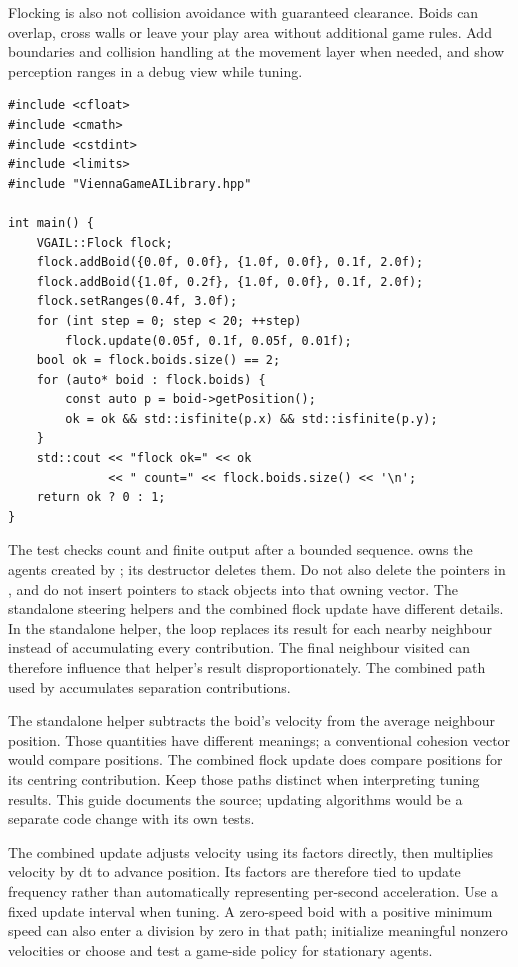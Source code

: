 \documentclass[11pt,a4paper]{article}
\begin{document}
Flocking is also not collision avoidance with guaranteed clearance. Boids can overlap, cross walls or leave your play area without additional game rules. Add boundaries and collision handling at the movement layer when needed, and show perception ranges in a debug view while tuning.
\begin{lstlisting}
#include <cfloat>
#include <cmath>
#include <cstdint>
#include <limits>
#include "ViennaGameAILibrary.hpp"

int main() {
    VGAIL::Flock flock;
    flock.addBoid({0.0f, 0.0f}, {1.0f, 0.0f}, 0.1f, 2.0f);
    flock.addBoid({1.0f, 0.2f}, {1.0f, 0.0f}, 0.1f, 2.0f);
    flock.setRanges(0.4f, 3.0f);
    for (int step = 0; step < 20; ++step)
        flock.update(0.05f, 0.1f, 0.05f, 0.01f);
    bool ok = flock.boids.size() == 2;
    for (auto* boid : flock.boids) {
        const auto p = boid->getPosition();
        ok = ok && std::isfinite(p.x) && std::isfinite(p.y);
    }
    std::cout << "flock ok=" << ok
              << " count=" << flock.boids.size() << '\n';
    return ok ? 0 : 1;
}
\end{lstlisting}
The test checks count and finite output after a bounded sequence.  owns the agents created by ; its destructor deletes them. Do not also delete the pointers in , and do not insert pointers to stack objects into that owning vector.
The standalone steering helpers and the combined flock update have different details. In the standalone  helper, the loop replaces its result for each nearby neighbour instead of accumulating every contribution. The final neighbour visited can therefore influence that helper's result disproportionately. The combined  path used by  accumulates separation contributions.

The standalone  helper subtracts the boid's velocity from the average neighbour position. Those quantities have different meanings; a conventional cohesion vector would compare positions. The combined flock update does compare positions for its centring contribution. Keep those paths distinct when interpreting tuning results. This guide documents the source; updating algorithms would be a separate code change with its own tests.

The combined update adjusts velocity using its factors directly, then multiplies velocity by dt to advance position. Its factors are therefore tied to update frequency rather than automatically representing per-second acceleration. Use a fixed update interval when tuning. A zero-speed boid with a positive minimum speed can also enter a division by zero in that path; initialize meaningful nonzero velocities or choose and test a game-side policy for stationary agents.
\end{document}
